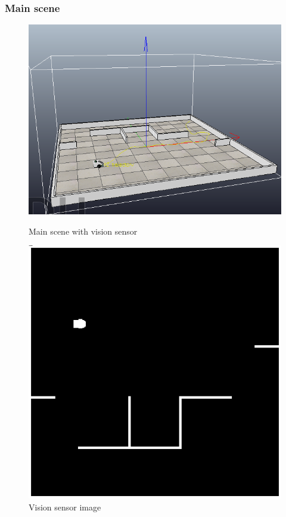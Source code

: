 \documentclass{beamer}
\begin{document}
	\begin{frame}
		\frametitle{Main scene}
		\begin{figure}
			\centering
			\begin{minipage}[b]{0.4\textwidth}
			\includegraphics[scale=0.25]{scene}
			\centering
			\caption{Main scene with vision sensor}
			\end{minipage}
			\hfill
			\begin{minipage}[b]{0.4\textwidth}
			\includegraphics[scale=0.35]{original}
			\centering
			\caption{Vision sensor image}
			\end{minipage}
		\end{figure}
	\end{frame}
	
\end{document}
